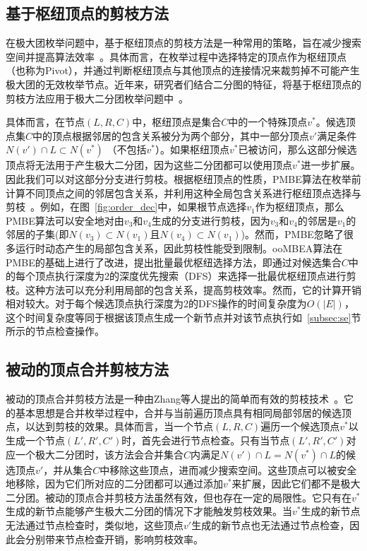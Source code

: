 \subsection{基于枢纽顶点的剪枝方法}
\label{subsec:pivot}

在极大团枚举问题中，基于枢纽顶点的剪枝方法是一种常用的策略，旨在减少搜索空间并提高算法效率~\cite{MCEdegeneracy10}。具体而言，在枚举过程中选择特定的顶点作为枢纽顶点（也称为Pivot），并通过判断枢纽顶点与其他顶点的连接情况来裁剪掉不可能产生极大团的无效枚举节点。近年来，研究者们结合二分图的特征，将基于枢纽顶点的剪枝方法应用于极大二分团枚举问题中~\cite{PMBE20,ooMBE22}。

具体而言，在节点$(L,R,C)$中，枢纽顶点是集合$C$中的一个特殊顶点$v^*$。候选顶点集$C$中的顶点根据邻居的包含关系被分为两个部分，其中一部分顶点$v'$满足条件$N(v') \cap L \subset N(v^*)$ （不包括$v^*$）。如果枢纽顶点$v^*$已被访问，那么这部分候选顶点将无法用于产生极大二分团，因为这些二分团都可以使用顶点$v^*$进一步扩展。因此我们可以对这部分分支进行剪枝。根据枢纽顶点的性质，PMBE算法在枚举前计算不同顶点之间的邻居包含关系，并利用这种全局包含关系进行枢纽顶点选择与剪枝~\cite{PMBE20}。例如，在图~\ref{fig:order_dec}中，如果根节点选择$v_1$作为枢纽顶点，那么PMBE算法可以安全地对由$v_3$和$v_4$生成的分支进行剪枝，因为$v_3$和$v_4$的邻居是$v_1$的邻居的子集(即$N(v_3)\subset N(v_1)$且$N(v_4)\subset N(v_1)$)。然而，PMBE忽略了很多运行时动态产生的局部包含关系，因此剪枝性能受到限制。ooMBEA算法在PMBE的基础上进行了改进，提出批量最优枢纽选择方法，即通过对候选集合$C$中的每个顶点执行深度为2的深度优先搜索（DFS）来选择一批最优枢纽顶点进行剪枝。这种方法可以充分利用局部的包含关系，提高剪枝效率。然而，它的计算开销相对较大。对于每个候选顶点执行深度为2的DFS操作的时间复杂度为$O(|E|)$，这个时间复杂度等同于根据该顶点生成一个新节点并对该节点执行如~\ref{subsec:se}节所示的节点检查操作。


\subsection{被动的顶点合并剪枝方法}
\label{subsec:pmp}

被动的顶点合并剪枝方法是一种由Zhang等人提出的简单而有效的剪枝技术~\cite{iMBEA14}。它的基本思想是合并枚举过程中，合并与当前遍历顶点具有相同局部邻居的候选顶点，以达到剪枝的效果。具体而言，当一个节点$(L, R, C)$遍历一个候选顶点$v^*$以生成一个节点$(L', R', C')$时，首先会进行节点检查。只有当节点$(L', R', C')$对应一个极大二分团时，该方法会合并集合$C$内满足$N(v') \cap L = N(v^*) \cap L$的候选顶点$v'$，并从集合$C$中移除这些顶点，进而减少搜索空间。这些顶点可以被安全地移除，因为它们所对应的二分团都可以通过添加$v^*$来扩展，因此它们都不是极大二分团。被动的顶点合并剪枝方法虽然有效，但也存在一定的局限性。它只有在$v^*$生成的新节点能够产生极大二分团的情况下才能触发剪枝效果。当$v^*$生成的新节点无法通过节点检查时，类似地，这些顶点$v'$生成的新节点也无法通过节点检查，因此会分别带来节点检查开销，影响剪枝效率。

